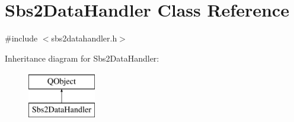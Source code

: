 \hypertarget{classSbs2DataHandler}{\section{Sbs2\-Data\-Handler Class Reference}
\label{classSbs2DataHandler}
}


{\ttfamily \#include $<$sbs2datahandler.\-h$>$}

Inheritance diagram for Sbs2\-Data\-Handler\-:\begin{figure}[H]
\begin{center}
\leavevmode
\includegraphics[height=2.000000cm]{classSbs2DataHandler}
\end{center}
\end{figure}
